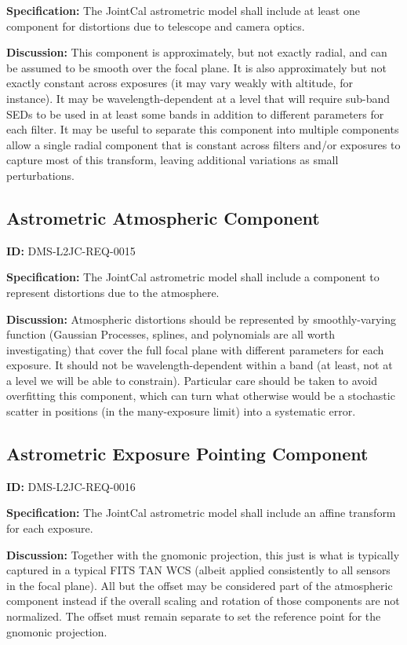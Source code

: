 \documentclass[SE,toc,lsstdraft]{lsstdoc}
\begin{document}
\textbf{Specification:}
The JointCal astrometric model shall include at least one component for distortions due to telescope and camera optics.

\textbf{Discussion:}
This component is approximately, but not exactly radial, and can be assumed to be smooth over the focal plane.  It is also approximately but not exactly constant across exposures (it may vary weakly with altitude, for instance).  It may be wavelength-dependent at a level that will require sub-band SEDs to be used in at least some bands in addition to different parameters for each filter.  It may be useful to separate this component into multiple components allow a single radial component that is constant across filters and/or exposures to capture most of this transform, leaving additional variations as small perturbations.

\subsection{Astrometric Atmospheric Component}

\label{DMS-L2JC-REQ-0015}
\textbf{ID:} DMS-L2JC-REQ-0015

\textbf{Specification:}
The JointCal astrometric model shall include a component to represent distortions due to the atmosphere.

\textbf{Discussion:}
Atmospheric distortions should be represented by smoothly-varying function (Gaussian Processes, splines, and polynomials are all worth investigating) that cover the full focal plane with different parameters for each exposure.  It should not be wavelength-dependent within a band (at least, not at a level we will be able to constrain).  Particular care should be taken to avoid overfitting this component, which can turn what otherwise would be a stochastic scatter in positions (in the many-exposure limit) into a systematic error.

\subsection{Astrometric Exposure Pointing Component}

\label{DMS-L2JC-REQ-0016}
\textbf{ID:} DMS-L2JC-REQ-0016

\textbf{Specification:}
The JointCal astrometric model shall include an affine transform for each exposure.

\textbf{Discussion:}
Together with the gnomonic projection, this just is what is typically captured in a typical FITS TAN WCS (albeit applied consistently to all sensors in the focal plane).  All but the offset may be considered part of the atmospheric component instead if the overall scaling and rotation of those components are not normalized.  The offset must remain separate to set the reference point for the gnomonic projection.
\end{document}
